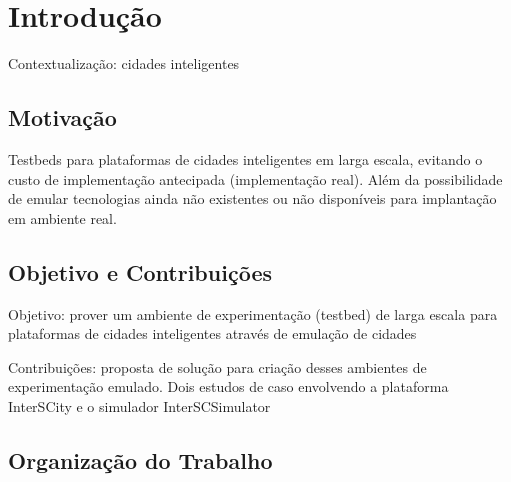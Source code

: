 \chapter{Introdução}
\label{cap:introducao}

Contextualização: cidades inteligentes

\section{Motivação}

Testbeds para plataformas de cidades inteligentes em larga escala, evitando o
custo de implementação antecipada (implementação real). Além da possibilidade
de emular tecnologias ainda não existentes ou não disponíveis para implantação
em ambiente real.

\section{Objetivo e Contribuições}

Objetivo: prover um ambiente de experimentação (testbed) de larga
escala para plataformas de cidades inteligentes através de emulação de
cidades

Contribuições: proposta de solução para criação desses ambientes de
experimentação emulado. Dois estudos de caso envolvendo a plataforma
InterSCity e o simulador InterSCSimulator

\section{Organização do Trabalho}
